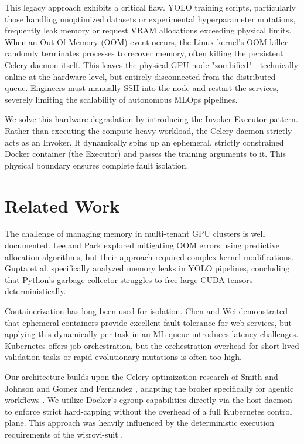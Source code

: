 \documentclass[10pt,twocolumn,letterpaper]{article}
\begin{document}
This legacy approach exhibits a critical flaw. YOLO training scripts, particularly those handling unoptimized datasets or experimental hyperparameter mutations, frequently leak memory or request VRAM allocations exceeding physical limits. When an Out-Of-Memory (OOM) event occurs, the Linux kernel's OOM killer randomly terminates processes to recover memory, often killing the persistent Celery daemon itself. This leaves the physical GPU node "zombified"—technically online at the hardware level, but entirely disconnected from the distributed queue. Engineers must manually SSH into the node and restart the services, severely limiting the scalability of autonomous MLOps pipelines.

We solve this hardware degradation by introducing the Invoker-Executor pattern. Rather than executing the compute-heavy workload, the Celery daemon strictly acts as an Invoker. It dynamically spins up an ephemeral, strictly constrained Docker container (the Executor) and passes the training arguments to it. This physical boundary ensures complete fault isolation.

\section{Related Work}
The challenge of managing memory in multi-tenant GPU clusters is well documented. Lee and Park \cite{oom2024mitigation} explored mitigating OOM errors using predictive allocation algorithms, but their approach required complex kernel modifications. Gupta et al. \cite{yolo2025memory} specifically analyzed memory leaks in YOLO pipelines, concluding that Python's garbage collector struggles to free large CUDA tensors deterministically. 

Containerization has long been used for isolation. Chen and Wei \cite{docker2023isolation} demonstrated that ephemeral containers provide excellent fault tolerance for web services, but applying this dynamically per-task in an ML queue introduces latency challenges. Kubernetes \cite{k8s2026overhead} offers job orchestration, but the orchestration overhead for short-lived validation tasks or rapid evolutionary mutations is often too high. 

Our architecture builds upon the Celery optimization research of Smith and Johnson \cite{smith2024celery} and Gomez and Fernandez \cite{celery2025broker}, adapting the broker specifically for agentic workflows \cite{llmops2025agentic}. We utilize Docker's cgroup capabilities \cite{nvidia2023vram} directly via the host daemon to enforce strict hard-capping without the overhead of a full Kubernetes control plane. This approach was heavily influenced by the deterministic execution requirements of the wisrovi-suit \cite{rodriguez2025wisrovi}.
\end{document}
